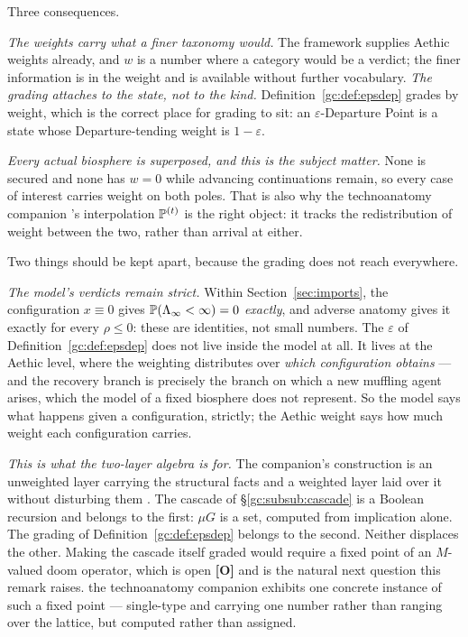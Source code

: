 \begin{remark}
\begin{remark}
Three consequences.

\emph{The weights carry what a finer taxonomy would.} The framework
supplies Aethic weights already, and $w$ is a number where a category
would be a verdict; the finer information is in the weight and is
available without further vocabulary. \emph{The grading attaches to the state, not to the kind.}
Definition~\ref{gc:def:epsdep} grades by weight, which is the correct
place for grading to sit: an $\varepsilon$-Departure Point is a state
whose Departure-tending weight is $1-\varepsilon$.

\emph{Every actual biosphere is superposed, and this is the subject
matter.} None is secured and none has $w=0$ while advancing
continuations remain, so every case of interest carries weight on both
poles. That is also why the technoanatomy companion \cite{GoldenTechnoanatomy}'s interpolation $\mathbb{P}^{(t)}$ is
the right object: it tracks the redistribution of weight between the
two, rather than arrival at either.
\end{remark}

\begin{remark}
\label{gc:rem:twolayers}
Two things should be kept apart, because the grading does not reach
everywhere.

\emph{The model's verdicts remain strict.} Within Section~\ref{sec:imports}, the
configuration $x\equiv0$ gives $\mathbb{P}(\Lambda_\infty<\infty)=0$
\emph{exactly}, and adverse anatomy gives it exactly for every
$\rho\le0$: these are identities, not small numbers. The $\varepsilon$
of Definition~\ref{gc:def:epsdep} does not live inside the model at
all. It lives at the Aethic level, where the weighting distributes over
\emph{which configuration obtains} --- and the recovery branch is
precisely the branch on which a new muffling agent arises, which the
model of a fixed biosphere does not represent. So the model says what
happens given a configuration, strictly; the Aethic weight says how
much weight each configuration carries.

\emph{This is what the two-layer algebra is for.} The companion's
construction is an unweighted layer carrying the structural facts and a
weighted layer laid over it without disturbing them
\cite{AethusTree}. The cascade of \S\ref{gc:subsub:cascade} is a Boolean
recursion and belongs to the first: $\mu G$ is a set, computed from
implication alone. The grading of
Definition~\ref{gc:def:epsdep} belongs to the second. Neither
displaces the other. Making the cascade itself graded would require a
fixed point of an $M$-valued doom operator, which is open \textbf{[O]}
and is the natural next question this remark raises.
the technoanatomy companion \cite{GoldenTechnoanatomy} exhibits one concrete instance of such a
fixed point --- single-type and carrying one number rather than ranging
over the lattice, but computed rather than assigned.
\end{remark}
\end{remark}

